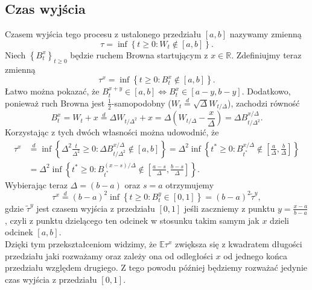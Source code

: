\documentclass[12pt]{mwart}
\begin{document}
	\subsection{Czas wyjścia}
	\noindent Czasem wyjścia tego procesu z ustalonego przedziału $[a, b]$ nazywamy zmienną
	\begin{equation*}
		\tau=\inf\left\{t\geqslant0:W_t\notin[a, b]\right\}.
	\end{equation*}
	Niech $\left\{B^x_t\right\}_{t\geqslant0}$ będzie ruchem Browna startującym z $x\in\mathbb{R}$. Zdefiniujmy teraz zmienną 
	\begin{equation*}
		\tau^x=\inf\left\{t\geqslant0:B^x_t\notin[a, b]\right\}.
	\end{equation*}
	 Łatwo można pokazać, że $B^{x+y}_t\in[a ,b] \iff B^x_t\in[a-y, b-y]$.
	Dodatkowo, ponieważ ruch Browna jest $\frac{1}{2}$-samopodobny ($W_t\overset{d}{=}\sqrt{\Delta}W_{t/\Delta}$), zachodzi równość
	\begin{equation*}
		B^x_t=W_t+x\overset{d}{=}\Delta W_{t/\Delta^2}+x = \Delta\left(W_{t/\Delta}-\frac{x}{\Delta}\right)=\Delta B^{x/\Delta}_{t/\Delta^2}.
	\end{equation*}
	Korzystając z tych dwóch własności można udowodnić, że
	\begin{equation*}
		\begin{split}
			\tau^x&\overset{d}{=}\inf\left\{\Delta^2\frac{t}{\Delta^2}\geqslant0:\Delta B^{x/\Delta}_{t/\Delta^2}\notin[a, b]\right\} =\Delta^2\inf\left\{t^*\geqslant0:B^{x/\Delta}_{t^*}\notin\left[\frac{a}{\Delta},\frac{b}{\Delta}\right]\right\}\\
			&=\Delta^2\inf\left\{t^*\geqslant0:B^{(x-s)/\Delta}_{t^*}\notin\left[\frac{a-s}{\Delta},\frac{b-s}{\Delta}\right]\right\}.
		\end{split}
	\end{equation*}
	Wybierając teraz $\Delta=(b-a)$ oraz $s=a$ otrzymujemy
	\begin{equation}\label{eq:tau_przeskalowane}
		\tau^x\overset{d}{=}(b-a)^2\inf\left\{t\geqslant0:B^y_t\in[0,1]\right\}=(b-a)^2\widetilde\tau^y,
	\end{equation}
	gdzie $\widetilde\tau^y$ jest czasem wyjścia z przedziału $[0, 1]$ jeśli zaczniemy z punktu $y=\frac{x-a}{b-a}$, czyli z punktu dzielącego ten odcinek w stosunku takim samym jak $x$ dzieli odcinek $[a, b]$.\vspace{1.5mm}\\
	\noindent Dzięki tym przekształceniom widzimy, że $\mathbb{E}\tau^x$ zwiększa się z kwadratem długości przedziału jaki rozważamy oraz zależy ona od odległości $x$ od jednego końca przedziału względem drugiego. Z tego powodu później będziemy rozważać jedynie czas wyjścia z przedziału $[0, 1]$.
	
\end{document}

